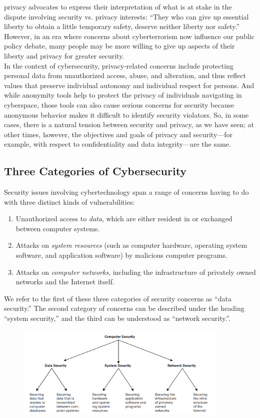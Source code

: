 \documentclass[12pt]{article}
\theoremstyle{definition}
\begin{document}
privacy advocates to express their interpretation of what is at stake in the dispute
involving security vs. privacy interests: “They who can give up essential liberty to obtain a
little temporary safety, deserve neither liberty nor safety.” However, in an era where
concerns about cyberterrorism now influence our public policy debate, many people may
be more willing to give up aspects of their liberty and privacy for greater security.\\
In the context of cybersecurity, privacy-related concerns include protecting personal
data from unauthorized access, abuse, and alteration, and thus reflect values that
preserve individual autonomy and individual respect for persons. And while anonymity
tools help to protect the privacy of individuals navigating
in cyberspace, those tools can also cause serious concerns for security because anonymous
behavior makes it difficult to identify security violators. So, in some cases, there is a
natural tension between security and privacy, as we have seen; at other times, however,
the objectives and goals of privacy and security—for example, with respect to confidentiality
and data integrity—are the same.
\subsection{Three Categories of Cybersecurity}
Security issues involving cybertechnology span a range of concerns having to do with
three distinct kinds of vulnerabilities:
\begin{enumerate}[label=\roman*]
\item Unauthorized access to \textit{data}, which are either resident in or exchanged
between computer systems.
\item Attacks on \textit{system resources} (such as computer hardware, operating system
software, and application software) by malicious computer programs.
\item Attacks on \textit{computer networks}, including the infrastructure of privately owned
networks and the Internet itself.
\end{enumerate}
We refer to the first of these three categories of security concerns as “data security.”
The second category of concerns can be described under the heading “system security,”
and the third can be understood as “network security.”.
\begin{figure}
\centering
\includegraphics[width=0.9\textwidth]{8.png}
\end{figure}
\end{document}
